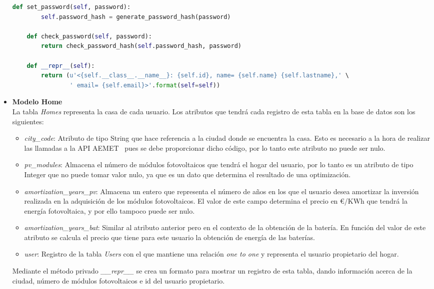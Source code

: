 \begin{itemize}
\begin{lstlisting}[language=Python,float=ht,caption={Modelo \textit{User}},label={lst:modelUser}]
    def set_password(self, password):
        self.password_hash = generate_password_hash(password)

    def check_password(self, password):
        return check_password_hash(self.password_hash, password)

    def __repr__(self):
        return (u'<{self.__class__.__name__}: {self.id}, name= {self.name} {self.lastname},' \
                ' email= {self.email}>'.format(self=self))
\end{lstlisting}
\item \textbf{Modelo Home}\\
La tabla \textit{Homes} representa la casa de cada usuario. Los atributos que tendrá cada registro de esta tabla en la base de datos son los siguientes:
\begin{itemize}
\item \textit{city\_code}: Atributo de tipo String que hace referencia a la ciudad donde se encuentra la casa. Esto es necesario a la hora de realizar las llamadas a la API AEMET~\cite{Aemet} pues se debe proporcionar dicho código, por lo tanto este atributo no puede ser nulo.
\item \textit{pv\_modules}: Almacena el número de módulos fotovoltaicos que tendrá el hogar del usuario, por lo tanto es un atributo de tipo Integer que no puede tomar valor nulo, ya que es un dato que determina el resultado de una optimización.
\item \textit{amortization\_years\_pv}: Almacena un entero que representa el número de años en los que el usuario desea amortizar la inversión realizada en la adquisición de los módulos fotovoltaicos. El valor de este campo determina el precio en €/KWh que tendrá la energía fotovoltaica, y por ello tampoco puede ser nulo.
\item \textit{amortization\_years\_bat}: Similar al atributo anterior pero en el contexto de la obtención de la batería. En función del valor de este atributo se calcula el precio que tiene para este usuario la obtención de energía de las baterías.
\item \textit{user}: Registro de la tabla \textit{Users} con el que mantiene una relación \textit{one to one} y representa el usuario propietario del hogar.
\end{itemize}
Mediante el método privado \textit{\_\_repr\_\_} se crea un formato para mostrar un registro de esta tabla, dando información acerca de la ciudad, número de módulos fotovoltaicos e id del usuario propietario.
\end{itemize}
